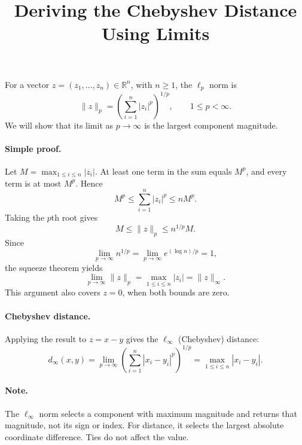 \documentclass[11pt]{article}
\title{Deriving the Chebyshev Distance Using Limits}
\author{}
\date{}
\begin{document}
\maketitle

For a vector $z=(z_1,\ldots,z_n)\in\mathbb{R}^n$, with $n\geq 1$, the
$\ell_p$ norm is
\[
  \|z\|_p = \left(\sum_{i=1}^n |z_i|^p\right)^{1/p},
  \qquad 1\leq p<\infty.
\]
We will show that its limit as $p\to\infty$ is the largest component magnitude.

\paragraph{Simple proof.}
Let $M=\max_{1\leq i\leq n}|z_i|$. At least one term in the sum equals
$M^p$, and every term is at most $M^p$. Hence
\[
  M^p \leq \sum_{i=1}^n |z_i|^p \leq nM^p.
\]
Taking the $p$th root gives
\[
  M \leq \|z\|_p \leq n^{1/p}M.
\]
Since
\[
  \lim_{p\to\infty}n^{1/p}
  =\lim_{p\to\infty}e^{(\log n)/p}=1,
\]
the squeeze theorem yields
\[
  \boxed{\lim_{p\to\infty}\|z\|_p
  =\max_{1\leq i\leq n}|z_i|
  =\|z\|_\infty.}
\]
This argument also covers $z=0$, when both bounds are zero.

\paragraph{Chebyshev distance.}
Applying the result to $z=x-y$ gives the $\ell_\infty$ (Chebyshev) distance:
\[
  \boxed{d_\infty(x,y)
  =\lim_{p\to\infty}\left(\sum_{i=1}^n|x_i-y_i|^p\right)^{1/p}
  =\max_{1\leq i\leq n}|x_i-y_i|.}
\]

\paragraph{Note.}
The $\ell_\infty$ norm selects a component with maximum magnitude and returns
that magnitude, not its sign or index. For distance, it selects the largest
absolute coordinate difference. Ties do not affect the value.
\end{document}

